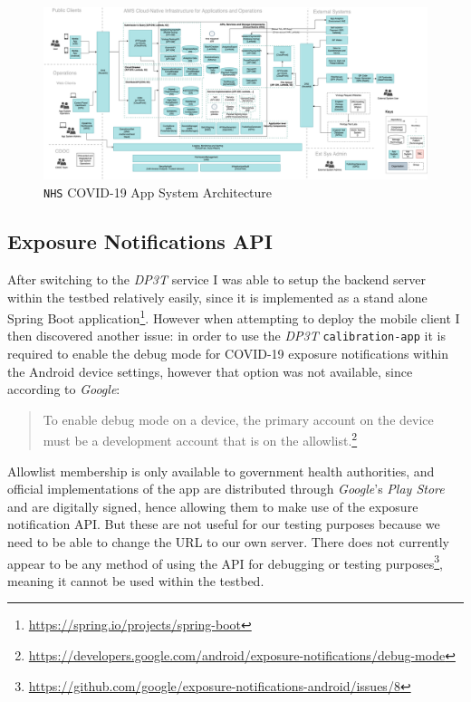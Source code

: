 \documentclass[
    author={Jacob Daniel Halsey},
    supervisor={Prof. Awais Rashid},
    degree={BSc},
    title={Building a Testbed for Evaluating Privacy Enhancing Technologies  (PETs)},
    subtitle={},
    type={software development},
    year={2021}
]{dissertation}
\begin{document}
\begin{figure}
	\centering
	\includegraphics[width=16cm]{img/nhs-covid}
	\caption{\texttt{NHS} COVID-19 App System Architecture}
\end{figure}

\subsection{Exposure Notifications API}

After switching to the \emph{DP3T} service I was able to setup the backend server within
the testbed relatively easily, since it is implemented as a stand alone Spring Boot 
application\footnote{\url{https://spring.io/projects/spring-boot}}. However when attempting
to deploy the mobile client I then discovered another issue: in order to 
use the \emph{DP3T} \texttt{calibration-app}
it is required to enable the debug mode for COVID-19 exposure notifications within the
Android device settings, however that option was not available, since according to \emph{Google}:

\begin{quotation}
	To enable debug mode on a device, the primary account on the device must be a development account that is on the allowlist.\footnote{\url{https://developers.google.com/android/exposure-notifications/debug-mode}}
\end{quotation}

Allowlist membership is only available to government health authorities, and
official implementations of the app are distributed through \emph{Google}'s \emph{Play Store} and are
digitally signed, hence allowing them to make use of the exposure notification API. But these are not useful
for our testing purposes because we need to be able to change the URL to our own server. There does not
currently appear to be any method of using the API for debugging or testing 
purposes\footnote{\url{https://github.com/google/exposure-notifications-android/issues/8}}, meaning it cannot
be used within the testbed.\\
\end{document}
